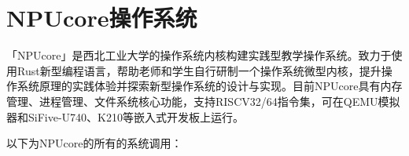 \section{NPUcore操作系统}

「NPUcore」是西北工业大学的操作系统内核构建实践型教学操作系统。致力于使用Rust新型编程语言，帮助老师和学生自行研制一个操作系统微型内核，提升操作系统原理的实践体验并探索新型操作系统的设计与实现。目前NPUcore具有内存管理、进程管理、文件系统核心功能，支持RISCV32/64指令集，可在QEMU模拟器和SiFive-U740、K210等嵌入式开发板上运行。

以下为NPUcore的所有的系统调用：
